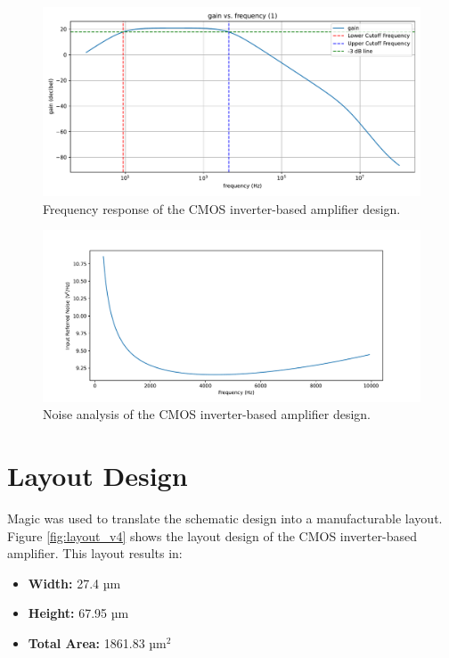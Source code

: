 \begin{figure}[ht!]
\centering
\includegraphics[width=\textwidth]{Figures/test.pdf}
\caption{Frequency response of the CMOS inverter-based amplifier design.}
\label{fig:frequency_response_v4}
\end{figure}

\begin{figure}[ht!]
\centering
\includegraphics[width=\textwidth]{Figures/inoise_v4.pdf}
\caption{Noise analysis of the CMOS inverter-based amplifier design.}
\label{fig:noise_v4}
\end{figure}

\section{Layout Design}

Magic was used to translate the schematic design into a manufacturable layout. 
Figure \ref{fig:layout_v4} shows the layout design of the CMOS inverter-based amplifier. This layout results in:

\begin{itemize}
\item \textbf{Width:} 27.4 µm
\item \textbf{Height:} 67.95 µm
\item \textbf{Total Area:} 1861.83 µm$^2$
\end{itemize}

